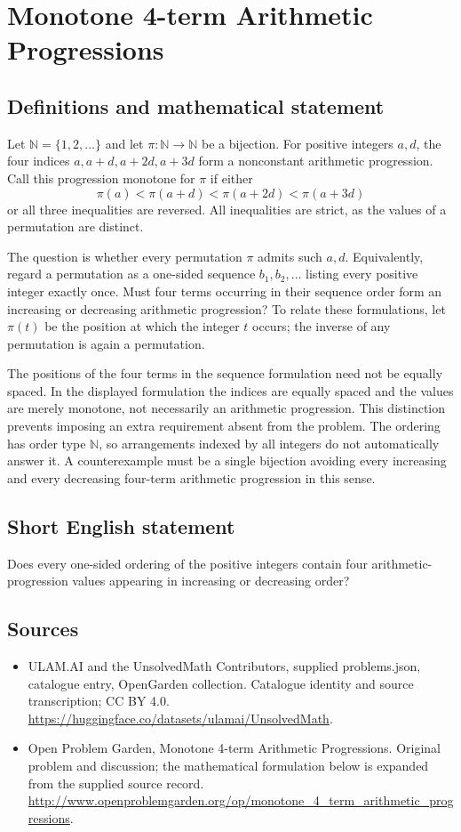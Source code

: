 \documentclass[11pt,a4paper]{article}
\begin{document}
\section*{Monotone 4-term Arithmetic Progressions}\label{statement}

\subsection{Definitions and mathematical statement}
Let $\mathbb N=\{1,2,\ldots\}$ and let $\pi:\mathbb N\to\mathbb N$ be a
bijection. For positive integers $a,d$, the four indices
$a,a+d,a+2d,a+3d$ form a nonconstant arithmetic progression. Call this
progression monotone for $\pi$ if either
\[
 \pi(a)<\pi(a+d)<\pi(a+2d)<\pi(a+3d)
\]
or all three inequalities are reversed. All inequalities are strict,
as the values of a permutation are distinct.

The question is whether every permutation $\pi$ admits such $a,d$.
Equivalently, regard a permutation as a one-sided sequence
$b_1,b_2,\ldots$ listing every positive integer exactly once. Must four
terms occurring in their sequence order form an increasing or decreasing
arithmetic progression? To relate these formulations, let $\pi(t)$ be the
position at which the integer $t$ occurs; the inverse of any permutation is
again a permutation.

The positions of the four terms in the sequence formulation need not be
equally spaced. In the displayed formulation the indices are equally
spaced and the values are merely monotone, not necessarily an arithmetic
progression. This distinction prevents imposing an extra requirement absent
from the problem. The ordering has order type $\mathbb N$, so arrangements
indexed by all integers do not automatically answer it. A counterexample
must be a single bijection avoiding every increasing and every decreasing
four-term arithmetic progression in this sense.
\subsection{Short English statement}
Does every one-sided ordering of the positive integers contain four arithmetic-progression values appearing in increasing or decreasing order?
\subsection{Sources}
\begin{itemize}
\item[S1] ULAM.AI and the UnsolvedMath Contributors, supplied problems.json, catalogue entry, OpenGarden collection. Catalogue identity and source transcription; CC BY 4.0.
\url{https://huggingface.co/datasets/ulamai/UnsolvedMath}.
\item[S2] Open Problem Garden, Monotone 4-term Arithmetic Progressions. Original problem and discussion; the mathematical formulation below is expanded from the supplied source record.
\url{http://www.openproblemgarden.org/op/monotone_4_term_arithmetic_progressions}.
\end{itemize}
\end{document}

